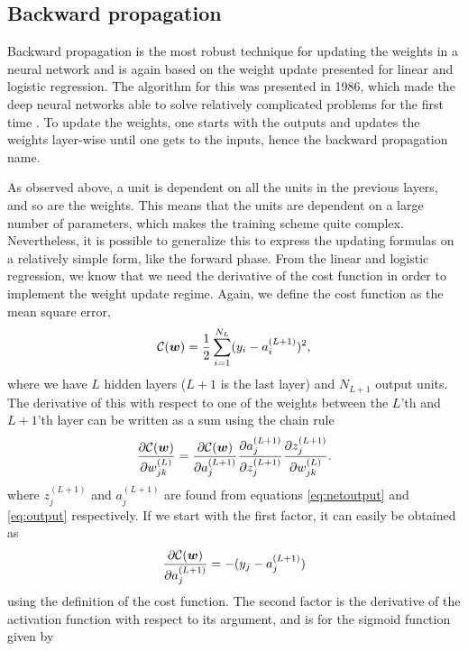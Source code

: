 \subsection{Backward propagation} \label{sec:backward}
Backward propagation is the most robust technique for updating the weights in a neural network and is again based on the weight update presented for linear and logistic regression. The algorithm for this was presented in 1986, which made the deep neural networks able to solve relatively complicated problems for the first time \supercite{rumelhart_learning_1986}. To update the weights, one starts with the outputs and updates the weights layer-wise until one gets to the inputs, hence the backward propagation name. 

As observed above, a unit is dependent on all the units in the previous layers, and so are the weights. This means that the units are dependent on a large number of parameters, which makes the training scheme quite complex. Nevertheless, it is possible to generalize this to express the updating formulas on a relatively simple form, like the forward phase. From the linear and logistic regression, we know that we need the derivative of the cost function in order to implement the weight update regime. Again, we define the cost function as the mean square error,
\begin{equation}
\mathcal{C}(\boldsymbol{{w}})=\frac{1}{2}\sum_{i=1}^{N_L}(y_i-a_i^{(L+1)})^2,
\end{equation}
where we have $L$ hidden layers ($L+1$ is the last layer) and $N_{L+1}$ output units. The derivative of this with respect to one of the weights between the $L$'th and $L+1$'th layer can be written as a sum using the chain rule
\begin{equation}
\frac{\partial\mathcal{C}(\boldsymbol{{w}})}{\partial w_{jk}^{(L)}}=\frac{\partial\mathcal{C}(\boldsymbol{{w}})}{\partial a_j^{(L+1)}}\frac{\partial a_j^{(L+1)}}{\partial z_j^{(L+1)}}\frac{\partial z_j^{(L+1)}}{\partial w_{jk}^{(L)}}.
\end{equation}
where $z_j^{(L+1)}$ and $a_j^{(L+1)}$ are found from equations \eqref{eq:netoutput} and \eqref{eq:output} respectively. If we start with the first factor, it can easily be obtained as
\begin{equation}
\frac{\partial\mathcal{C}(\boldsymbol{{w}})}{\partial a_j^{(L+1)}}=-(y_j-a_j^{(L+1)})
\end{equation}
using the definition of the cost function. The second factor is the derivative of the activation function with respect to its argument, and is for the sigmoid function given by
